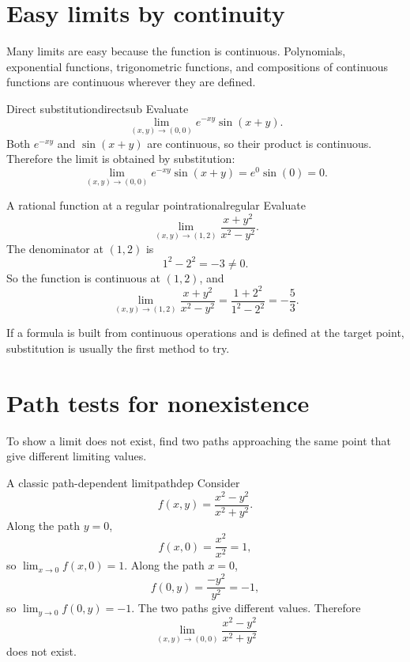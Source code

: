\documentclass[11pt]{article}
\begin{document}
\section{Easy limits by continuity}

Many limits are easy because the function is continuous. Polynomials, exponential functions, trigonometric functions, and compositions of continuous functions are continuous wherever they are defined.

\begin{workedexample}{Direct substitution}{directsub}
Evaluate
\[
\lim_{(x,y)\to(0,0)} e^{-xy}\sin(x+y).
\]
Both $e^{-xy}$ and $\sin(x+y)$ are continuous, so their product is continuous. Therefore the limit is obtained by substitution:
\[
\lim_{(x,y)\to(0,0)} e^{-xy}\sin(x+y)=e^0\sin(0)=0.
\]
\end{workedexample}

\begin{workedexample}{A rational function at a regular point}{rationalregular}
Evaluate
\[
\lim_{(x,y)\to(1,2)} \frac{x+y^2}{x^2-y^2}.
\]
The denominator at $(1,2)$ is
\[
1^2-2^2=-3\ne 0.
\]
So the function is continuous at $(1,2)$, and
\[
\lim_{(x,y)\to(1,2)} \frac{x+y^2}{x^2-y^2}
=
\frac{1+2^2}{1^2-2^2}
=-\frac{5}{3}.
\]
\end{workedexample}

\begin{notebox}
If a formula is built from continuous operations and is defined at the target point, substitution is usually the first method to try.
\end{notebox}

\section{Path tests for nonexistence}

To show a limit does not exist, find two paths approaching the same point that give different limiting values.

\begin{workedexample}{A classic path-dependent limit}{pathdep}
Consider
\[
f(x,y)=\frac{x^2-y^2}{x^2+y^2}.
\]
Along the path $y=0$,
\[
f(x,0)=\frac{x^2}{x^2}=1,
\]
so $\lim_{x\to0} f(x,0)=1$. Along the path $x=0$,
\[
f(0,y)=\frac{-y^2}{y^2}=-1,
\]
so $\lim_{y\to0} f(0,y)=-1$. The two paths give different values. Therefore
\[
\lim_{(x,y)\to(0,0)} \frac{x^2-y^2}{x^2+y^2}
\]
does not exist.
\end{workedexample}
\end{document}

